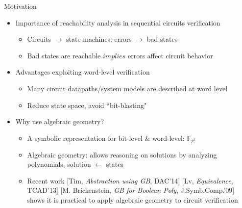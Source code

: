 \documentclass[xcolor=dvipsnames]{beamer}
\newcommand{\Fkk}{{\mathbb{F}}_{2^k}}
\begin{document}
\begin{frame}{\large {Motivation}}
\vspace{-0.2in}

\begin{itemize}
\item Importance of reachability analysis in sequential circuits verification
	\begin{itemize}
	\item Circuits $\to$ state machines; errors $\to$ bad states
	\item Bad states are reachable $implies$ errors affect circuit behavior
	\end{itemize}
\end{itemize}

\begin{itemize}
\item Advantages exploiting word-level verification
	\begin{itemize}
	\item Many circuit datapaths/system models are described at word level
	\item Reduce state space, avoid ``bit-blasting"
	\end{itemize}	
\end{itemize}


\begin{itemize}
\item Why use algebraic geometry?
	\begin{itemize}
    \item A symbolic representation for bit-level \& word-level: $\Fkk$
    \item Algebraic geometry: allows reasoning on solutions by analyzing polynomials, solution $\gets$ states
	\item Recent work [Tim, {\it Abstraction using GB}, DAC'14] [Lv, {\it Equivalence}, TCAD'13] [M. Brickenstein, {\it GB for Boolean Poly}, J.Symb.Comp.'09]
	shows it is practical to apply algebraic geometry to circuit verification
	\end{itemize}
\end{itemize}

\end{frame}
\end{document}
